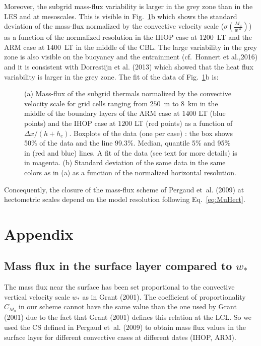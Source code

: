 Moreover, the subgrid mass-flux variability is larger in the grey zone than in the LES and at mesoscales. This is visible in Fig.~\ref{trigDavid}b which shows the standard deviation of the mass-flux normalized by the convective velocity scale ($\sigma(\frac{M_u}{w*})$) as a function of the normalized resolution in the IHOP case at $1200$~LT and the ARM case at $1400$~LT in the middle of the CBL. The large variability in the grey zone is also visible on the buoyancy and the entrainment (cf.~Honnert et al.,2016) and it is consistent with Dorrestijn et al. (2013) which showed that the heat flux variability is larger in the grey zone. The fit of the data of Fig.~\ref{trigDavid}b is:

\begin{figure}
\caption[]{(a) Mass-flux of the subgrid thermals normalized by the convective velocity scale for grid cells ranging from $250$~m to $8$~km in the middle of the boundary layers of the ARM case at $1400$ LT (blue points) and the IHOP case at $1200$ LT (red points) as a function of $\Delta x/({h}+{h}_{c})$. Boxplots of the data (one per case) : the box shows 50\% of the data and the line 99.3\%. Median, quantile 5\% and 95\% in (red and blue) lines. A fit of the data (see text for more details) is in magenta. (b) Standard deviation of the same data in the same colors as in (a) as a function of the normalized horizontal resolution.}
\label{trigDavid}
\end{figure}

Concequently, the closure of the mass-flux scheme of Pergaud et~al. (2009) at hectometric scales depend on the model resolution following Eq.~\ref{eq:MuHect}.   

\section{Appendix}
\subsection{Mass flux in the surface layer compared to $w_*$}
\label{sec:MF_W}

The mass flux near the surface has been set proportional to the convective vertical velocity scale $w_*$ as in Grant (2001). The coefficient of proportionality $C_{M_0}$ in our scheme cannot have the same value than the one used by Grant (2001) due to the fact that Grant (2001) defines this relation at the LCL. So we used the CS defined in Pergaud et~al. (2009) to obtain mass flux values in the surface layer for different convective cases at different dates (IHOP, ARM).

